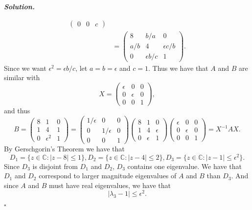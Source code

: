 \documentclass[12pt]{report}
\newenvironment{solution}[1][\it{Solution}]{\textbf{#1. } }{$\square$}
\def\C{{\mathbb C}}
\begin{document}
\begin{solution}
\begin{enumerate}
\begin{align*}
\begin{pmatrix}
                0&0&c
            \end{pmatrix}\\
            &=\begin{pmatrix}
                8&b/a&0\\
                a/b&4&\epsilon c/b\\
                0&\epsilon b/c& 1
            \end{pmatrix}.
        \end{align*}
        Since we want $\epsilon^2 = \epsilon b/c$, let $a = b = \epsilon$ and $ c = 1$. Thus we have that $A$ and $B$ are similar with
        \[ X = \begin{pmatrix}
            \epsilon & 0 & 0 \\
            0 & \epsilon & 0\\
            0 & 0 & 1
        \end{pmatrix},
        \]
        and thus
        \[ 
            B = \begin{pmatrix}
                8 & 1 & 0\\
                1 & 4 & 1\\
                0 & \epsilon^2 & 1
            \end{pmatrix} = \begin{pmatrix}
                1/\epsilon & 0 & 0 \\
                0 & 1/\epsilon & 0\\
                0 & 0 & 1
            \end{pmatrix}\begin{pmatrix}8&1&0\\1&4&\epsilon\\0&\epsilon&1 \end{pmatrix}\begin{pmatrix}
                \epsilon&0&0\\
                0&\epsilon&0\\
                0&0&1
            \end{pmatrix} = X^{-1}AX.
        \]
        By Gerschgorin's Theorem we have that
        \[ D_1 = \{z \in \C : |z - 8| \leq 1 \}, D_2 = \{z \in \C : |z - 4| \leq 2 \}, D_3 = \{z \in \C : |z - 1| \leq \epsilon^2 \}.\]
        Since $D_3$ is disjoint from $D_1$ and $D_2$, $D_3$ contains one eigenvalue. We have that $D_1$ and $D_2$ correspond to larger magnitude eigenvalues of $A$ and $B$ than $D_3$. And since $A$ and $B$ must have real eigenvalues, we have that
        \[ |\lambda_3 - 1| \leq \epsilon^2. \] 

    \end{enumerate}
\end{solution}
\end{document}
